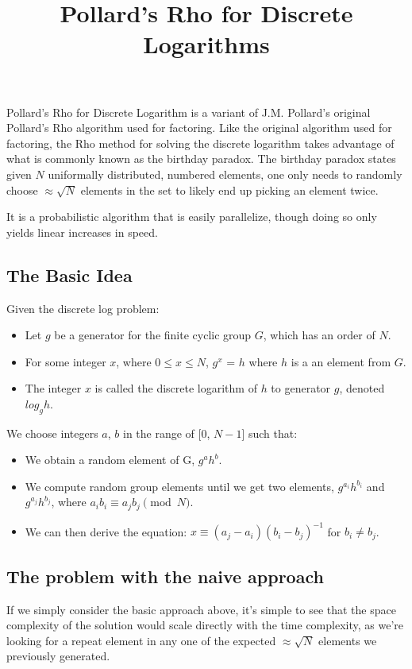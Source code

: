 \documentclass{article}
\title{Pollard's Rho for Discrete Logarithms}
\begin{document}
  \maketitle

  Pollard's Rho for Discrete Logarithm is a variant of J.M. Pollard's original Pollard's Rho algorithm used for factoring. Like the original algorithm used for factoring, the Rho method for solving the discrete logarithm takes advantage of what is commonly known as the birthday paradox.  The birthday paradox states given $N$ uniformally distributed, numbered elements, one only needs to randomly choose $\approx\sqrt{N}$ elements in the set to likely end up picking an element twice.

  It is a probabilistic algorithm that is easily parallelize, though doing so only yields linear increases in speed.

  \subsection{The Basic Idea}
    Given the discrete log problem:
    \begin{itemize}
      \item Let $g$ be a generator for the finite cyclic group $G$, which has an order of $N$.
      \item For some integer $x$, where $0 \leq x \leq N$, $g^x$ = $h$ where $h$ is a an element from $G$.
      \item The integer $x$ is called the discrete logarithm of $h$ to generator $g$, denoted $log_{g} h$.
    \end{itemize}
    We choose integers $a$, $b$ in the range of [$0$, $N - 1$] such that:
    \begin{itemize}
      \item We obtain a random element of G, $g^ah^b$.
      \item We compute random group elements until we get two elements, $g^{a_i}h^{b_i}$ and $g^{a_j}h^{b_j}$, where $a_ib_i \equiv a_jb_j \pmod{N}$.
      \item We can then derive the equation: $x \equiv (a_j - a_i)(b_i - b_j)^{-1}$ for $b_i \neq b_j$. 
    \end{itemize}
  \subsection{The problem with the naive approach}
    If we simply consider the basic approach above, it's simple to see that the space complexity of the solution would scale directly with the time complexity, as we're looking for a repeat element in any one of the expected $\approx\sqrt{N}$ elements we previously generated.
\end{document}
